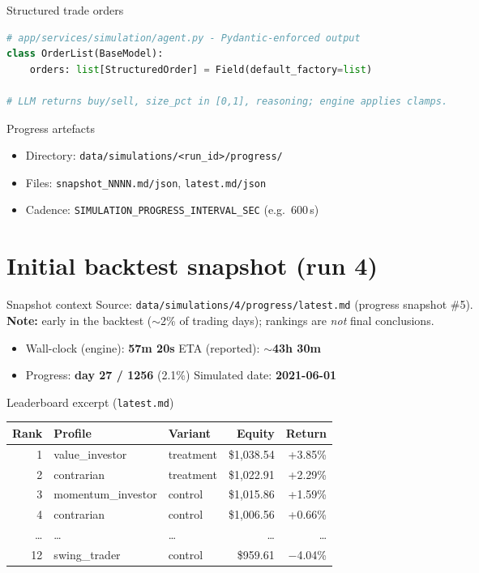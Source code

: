 \documentclass[aspectratio=169,11pt]{beamer}
\begin{document}
\begin{frame}[fragile]{Structured trade orders}
\begin{lstlisting}[language=Python]
# app/services/simulation/agent.py - Pydantic-enforced output
class OrderList(BaseModel):
    orders: list[StructuredOrder] = Field(default_factory=list)

# LLM returns buy/sell, size_pct in [0,1], reasoning; engine applies clamps.
\end{lstlisting}
\end{frame}

\begin{frame}{Progress artefacts}
  \begin{itemize}
    \item Directory: \texttt{data/simulations/<run\_id>/progress/}
    \item Files: \texttt{snapshot\_NNNN.md/json}, \texttt{latest.md/json}
    \item Cadence: \texttt{SIMULATION\_PROGRESS\_INTERVAL\_SEC} (e.g.\ 600\,s)
  \end{itemize}
\end{frame}

\section{Initial backtest snapshot (run 4)}

\begin{frame}{Snapshot context}
  \footnotesize
  Source: \texttt{data/simulations/4/progress/latest.md} (progress snapshot \#5). \\
  \textbf{Note:} early in the backtest ($\sim$2\% of trading days); rankings are \emph{not} final conclusions.
  \vfill
  \begin{itemize}
    \item Wall-clock (engine): \textbf{57m 20s} \quad ETA (reported): $\sim$\textbf{43h 30m}
    \item Progress: \textbf{day 27 / 1256} (2.1\%) \quad Simulated date: \textbf{2021-06-01}
  \end{itemize}
\end{frame}

\begin{frame}{Leaderboard excerpt (\texttt{latest.md})}
  \footnotesize
  \begin{tabular}{@{}r l l r r@{}}
    \toprule
    Rank & Profile & Variant & Equity & Return \\
    \midrule
    1 & value\_investor & treatment & \$1{,}038.54 & +3.85\% \\
    2 & contrarian & treatment & \$1{,}022.91 & +2.29\% \\
    3 & momentum\_investor & control & \$1{,}015.86 & +1.59\% \\
    4 & contrarian & control & \$1{,}006.56 & +0.66\% \\
    \ldots & \ldots & \ldots & \ldots & \ldots \\
    12 & swing\_trader & control & \$959.61 & $-$4.04\% \\
    \bottomrule
  \end{tabular}
\end{frame}
\end{document}
